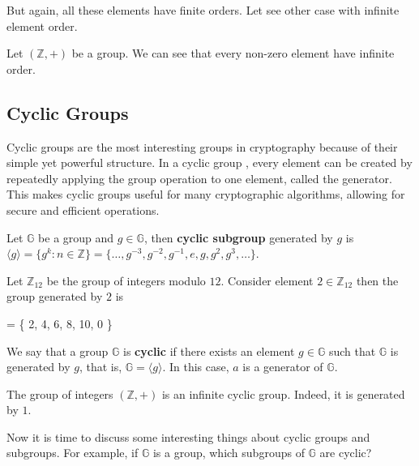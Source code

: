 \documentclass[../lecture-notes-148x210.tex]{subfiles}
\begin{document}
But again, all these elements have finite orders. Let see other case with infinite element order.

\begin{example}
    Let $(\mathbb{Z}, +)$ be a group. We can see that every non-zero element have infinite order.
\end{example}

\subsection{Cyclic Groups}

Cyclic groups are the most interesting groups in cryptography because of their simple yet 
powerful structure. In a cyclic group \cite[section 4]{Judson_2012}, every element can be created by repeatedly applying the 
group operation to one element, called the generator. This makes cyclic groups useful for many 
cryptographic algorithms, allowing for secure and efficient operations. 

\begin{definition}
    Let $\mathbb{G}$ be a group and $g \in \mathbb{G}$, then \textbf{cyclic subgroup} generated 
    by $g$ is $\langle g \rangle = \{g^k: n \in \mathbb{Z}\} = 
    \{\dots,g^{-3}, g^{-2}, g^{-1}, e, g, g^2, g^3, \dots\}$.
\end{definition}

\begin{example}
    Let $\mathbb{Z}_{12}$ be the group of integers modulo $12$. 
    Consider element $2 \in \mathbb{Z}_{12}$ then the group generated by $2$ is
    \begin{xequation}
         \rangle = \{ 2, 4, 6, 8, 10, 0 \}
    \end{xequation}
\end{example}

\begin{definition}
    We say that a group $\mathbb{G}$ is \textbf{cyclic} if there exists an element $g \in \mathbb{G}$ 
    such that $\mathbb{G}$ is generated by $g$, that is, $\mathbb{G} = \langle g \rangle$. 
    In this case, $a$ is a generator of $\mathbb{G}$.
\end{definition}

\begin{example}
    The group of integers $(\mathbb{Z},+)$ is an infinite cyclic group. Indeed, it is 
    generated by $1$.
\end{example}

Now it is time to discuss some interesting things about cyclic groups and subgroups.
For example, if $\mathbb{G}$ is a group, which subgroups of $\mathbb{G}$ are cyclic?
\end{document}

